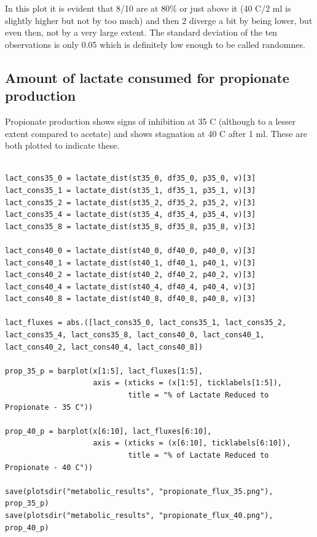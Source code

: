 \documentclass[11pt]{article}
\begin{document}
In this plot it is evident that 8/10 are at 80\% or just above it (40 C/2 ml is slightly higher but not by too much) and then 2 diverge a bit by being lower, but even then, not by a very large extent. The standard deviation of the ten observations is only 0.05 which is definitely low enough to be called randomnes.

\subsection{Amount of lactate consumed for propionate production}
\label{sec:orgbacb1fc}
Propionate production shows signs of inhibition at 35 C (although to a lesser extent compared to acetate) and shows stagnation at 40 C after 1 ml. These are both plotted to indicate these.

\begin{verbatim}

lact_cons35_0 = lactate_dist(st35_0, df35_0, p35_0, v)[3]
lact_cons35_1 = lactate_dist(st35_1, df35_1, p35_1, v)[3]
lact_cons35_2 = lactate_dist(st35_2, df35_2, p35_2, v)[3]
lact_cons35_4 = lactate_dist(st35_4, df35_4, p35_4, v)[3]
lact_cons35_8 = lactate_dist(st35_8, df35_8, p35_8, v)[3]

lact_cons40_0 = lactate_dist(st40_0, df40_0, p40_0, v)[3]
lact_cons40_1 = lactate_dist(st40_1, df40_1, p40_1, v)[3]
lact_cons40_2 = lactate_dist(st40_2, df40_2, p40_2, v)[3]
lact_cons40_4 = lactate_dist(st40_4, df40_4, p40_4, v)[3]
lact_cons40_8 = lactate_dist(st40_8, df40_8, p40_8, v)[3]

lact_fluxes = abs.([lact_cons35_0, lact_cons35_1, lact_cons35_2, lact_cons35_4, lact_cons35_8, lact_cons40_0, lact_cons40_1, lact_cons40_2, lact_cons40_4, lact_cons40_8])

prop_35_p = barplot(x[1:5], lact_fluxes[1:5],
                    axis = (xticks = (x[1:5], ticklabels[1:5]),
                            title = "% of Lactate Reduced to Propionate - 35 C"))

prop_40_p = barplot(x[6:10], lact_fluxes[6:10],
                    axis = (xticks = (x[6:10], ticklabels[6:10]),
                            title = "% of Lactate Reduced to Propionate - 40 C"))

save(plotsdir("metabolic_results", "propionate_flux_35.png"), prop_35_p)
save(plotsdir("metabolic_results", "propionate_flux_40.png"), prop_40_p)
\end{verbatim}
\end{document}
